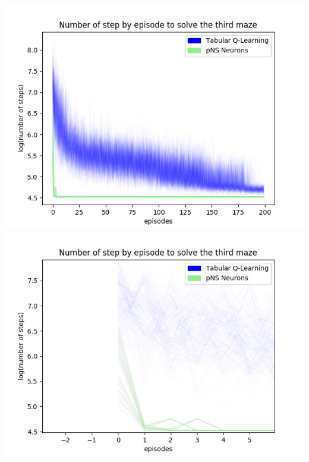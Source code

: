 \documentclass[10pt]{article}
\begin{document}
\indent\indent\indent\indent\includegraphics[scale=0.48]{Figure_log_final3.png}\includegraphics[scale=0.48]{Figure_log_beg3.png}\\
\end{document}
